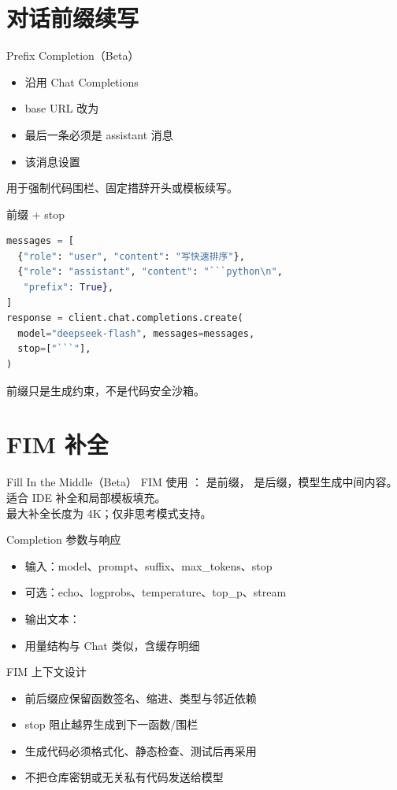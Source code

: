 \documentclass[aspectratio=169,UTF8]{ctexbeamer}
\begin{document}
\section{对话前缀续写}
\begin{frame}{Prefix Completion（Beta）}
\begin{itemize}
  \item 沿用 Chat Completions
  \item base URL 改为 
  \item 最后一条必须是 assistant 消息
  \item 该消息设置 
\end{itemize}
用于强制代码围栏、固定措辞开头或模板续写。
\end{frame}
\begin{frame}[fragile]{前缀 + stop}
\begin{lstlisting}[language=Python]
messages = [
  {"role": "user", "content": "写快速排序"},
  {"role": "assistant", "content": "```python\n",
   "prefix": True},
]
response = client.chat.completions.create(
  model="deepseek-flash", messages=messages,
  stop=["```"],
)
\end{lstlisting}
前缀只是生成约束，不是代码安全沙箱。
\end{frame}
\section{FIM 补全}
\begin{frame}{Fill In the Middle（Beta）}
FIM 使用 ： 是前缀， 是后缀，模型生成中间内容。适合 IDE 补全和局部模板填充。\\[8pt]
最大补全长度为 4K；仅非思考模式支持。
\end{frame}
\begin{frame}{Completion 参数与响应}
\begin{itemize}
  \item 输入：model、prompt、suffix、max\_tokens、stop
  \item 可选：echo、logprobs、temperature、top\_p、stream
  \item 输出文本：
  \item 用量结构与 Chat 类似，含缓存明细
\end{itemize}
\end{frame}
\begin{frame}{FIM 上下文设计}
\begin{itemize}
  \item 前后缀应保留函数签名、缩进、类型与邻近依赖
  \item stop 阻止越界生成到下一函数/围栏
  \item 生成代码必须格式化、静态检查、测试后再采用
  \item 不把仓库密钥或无关私有代码发送给模型
\end{itemize}
\end{frame}
\end{document}
